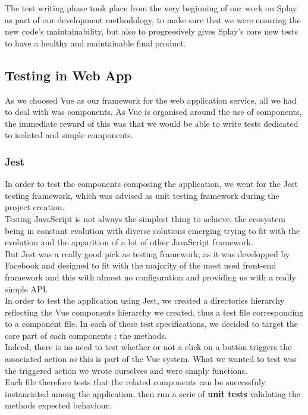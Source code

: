 \documentclass{eplmastersthesis}
\begin{document}
      The test writing phase took place from the very beginning of our work on
      Splay as part of our development methodology,
      to make sure that we were ensuring the new code's maintainability, but
      also to progressively gives Splay's core new tests to have a healthy
      and maintainable final product.

      \subsection{Testing in Web App}

        As we choosed Vue as our framework for the web application service,
        all we had to deal with was components. As Vue is organised around
        the use of components, the immediate reward of this was that we would
        be able to write tests dedicated to isolated and simple components.

        \subsubsection{Jest}

          In order to test the components composing the application, we
          went for the Jest \cite{jest} testing framework, which was advised
          as unit testing framework during the project creation.\\

          Testing JavaScript is not always the simplest thing to achieve, the
          ecosystem being in constant evolution with diverse solutions emerging
          trying to fit with the evolution and the apparition of a lot of
          other JavaScript framework.\\
          But Jest was a really good pick as testing framework, as it was
          developped by Facebook and designed to fit with the majority of the
          most used front-end framework and this with almost no configuration and
          providing us with a really simple API.\\

          In order to test the application using Jest, we created a directories
          hierarchy reflecting the Vue components hierarchy we created, thus
          a test file corresponding to a component file. In each of these
          test specifications, we decided to target the core part of each
          components : the methods.\\
          Indeed, there is no need to test whether or not a click on a button
          triggers the associated action as this is part of the Vue system. What
          we wanted to test was the triggered action we wrote ourselves and
          were simply functions.\\
          Each file therefore tests that the related components can be
          successfuly instanciated among the application, then run a serie
          of \textbf{unit tests} validating the methods expected behaviour.
\end{document}

